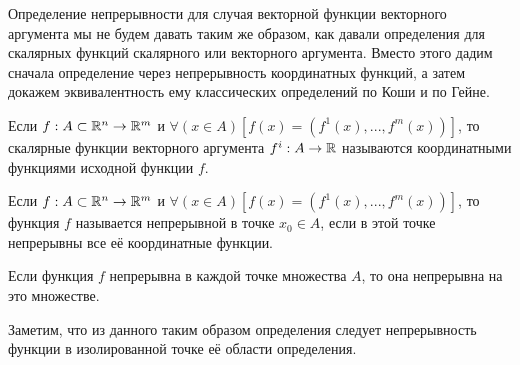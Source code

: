 Определение непрерывности для случая векторной функции векторного аргумента мы не будем давать таким же образом, как давали определения для скалярных функций скалярного или векторного аргумента.
Вместо этого дадим сначала определение через непрерывность координатных функций, а затем докажем эквивалентность ему классических определений по Коши и по Гейне.

\begin{opr}
Если $f:A\subset\mathbb{R}^n\to\mathbb{R}^m$ и $\forall(x\in A)[f(x)=(f^1(x), ... , f^m(x))]$, то скалярные функции векторного аргумента $f^i:A\to\mathbb{R}$ называются координатными функциями исходной функции $f$.
\end{opr}

\begin{opr}\label{opred_predela_Rn_Rm_nepr}
Если $f:A\subset\mathbb{R}^n\to\mathbb{R}^m$ и $\forall(x\in A)[f(x)=(f^1(x), ... , f^m(x))]$, то функция $f$ называется непрерывной в точке $x_0\in A$, если в этой точке непрерывны все её координатные функции.
\end{opr}

\begin{opr}
Если функция $f$ непрерывна в каждой точке множества $A$, то она непрерывна на это множестве.
\end{opr}

Заметим, что из данного таким образом определения следует непрерывность функции в изолированной точке её области определения.

